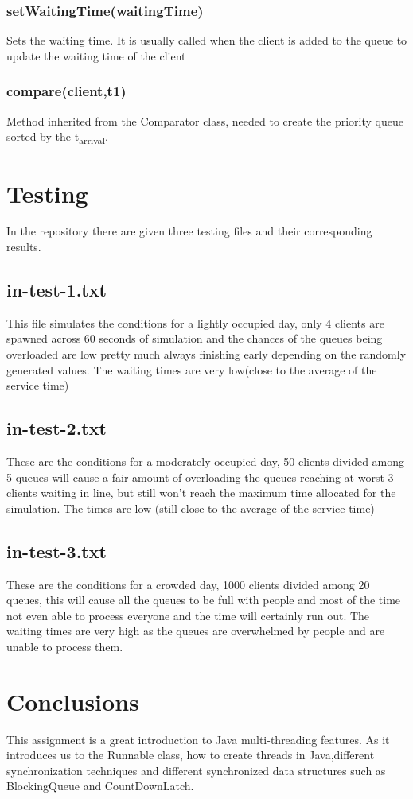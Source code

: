 \documentclass[10pt,a4paper]{article}
\begin{document}
\subsubsection{setWaitingTime(waitingTime)}
Sets the waiting time. It is usually called when the client is added to the queue to update the waiting time of the client
\subsubsection{compare(client,t1)}
Method inherited from the Comparator class, needed to create the priority queue sorted by the t\textsubscript{arrival}.
\section{Testing}
In the repository there are given three testing files and their corresponding results.
\subsection{in-test-1.txt}
This file simulates the conditions for a lightly occupied day, only 4 clients are spawned across 60 seconds of simulation and the chances of the queues being overloaded are low pretty much always finishing early depending on the randomly generated values. The waiting times are very low(close to the average of the service time)
\subsection{in-test-2.txt}
These are the conditions for a moderately occupied day, 50 clients divided among 5 queues will cause a fair amount of overloading the queues reaching at worst 3 clients waiting in line, but still won't reach the maximum time allocated for the simulation. The times are low (still close to the average of the service time)
\subsection{in-test-3.txt}
These are the conditions for a crowded day, 1000 clients divided among 20 queues, this will cause all the queues to be full with people and most of the time not even able to process everyone and the time will certainly run out. The waiting times are very high as the queues are overwhelmed by people and are unable to process them.
\section{Conclusions}
This assignment is a great introduction to Java multi-threading features. As it introduces us to the Runnable class, how to create threads in Java,different synchronization techniques and different synchronized data structures such as BlockingQueue and CountDownLatch.
\end{document}
